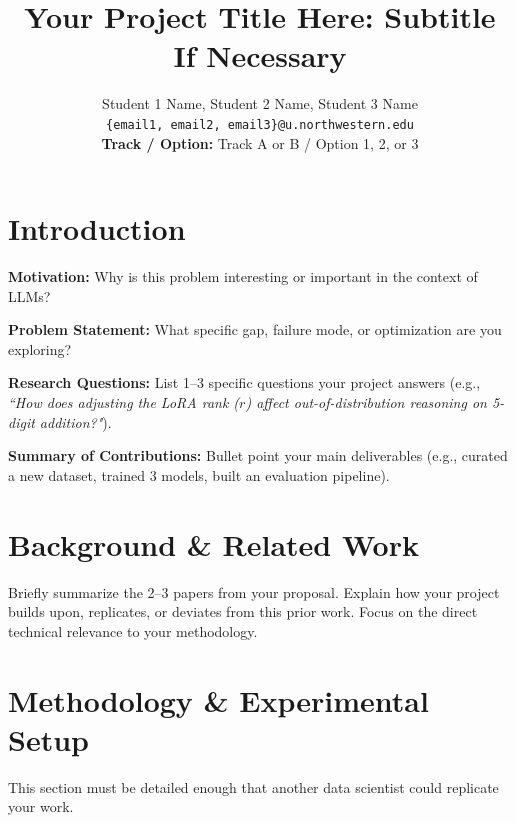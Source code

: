 \documentclass[11pt, twocolumn]{article}
\title{\vspace{-2em}\textbf{Your Project Title Here: Subtitle If Necessary}}
\author{
    Student 1 Name, Student 2 Name, Student 3 Name \\
    \texttt{\{email1, email2, email3\}@u.northwestern.edu} \\
    \vspace{0.5em}
    \textbf{Track / Option:} Track A or B / Option 1, 2, or 3
}
\date{} %
\begin{document}

\section{Introduction}
\textbf{Motivation:} Why is this problem interesting or important in the context of LLMs? 

\textbf{Problem Statement:} What specific gap, failure mode, or optimization are you exploring? 

\textbf{Research Questions:} List 1--3 specific questions your project answers (e.g., \textit{``How does adjusting the LoRA rank ($r$) affect out-of-distribution reasoning on 5-digit addition?"}).

\textbf{Summary of Contributions:} Bullet point your main deliverables (e.g., curated a new dataset, trained 3 models, built an evaluation pipeline).

\section{Background \& Related Work}
Briefly summarize the 2--3 papers from your proposal. Explain how your project builds upon, replicates, or deviates from this prior work. Focus on the direct technical relevance to your methodology.

\section{Methodology \& Experimental Setup}
This section must be detailed enough that another data scientist could replicate your work.
\end{document}

